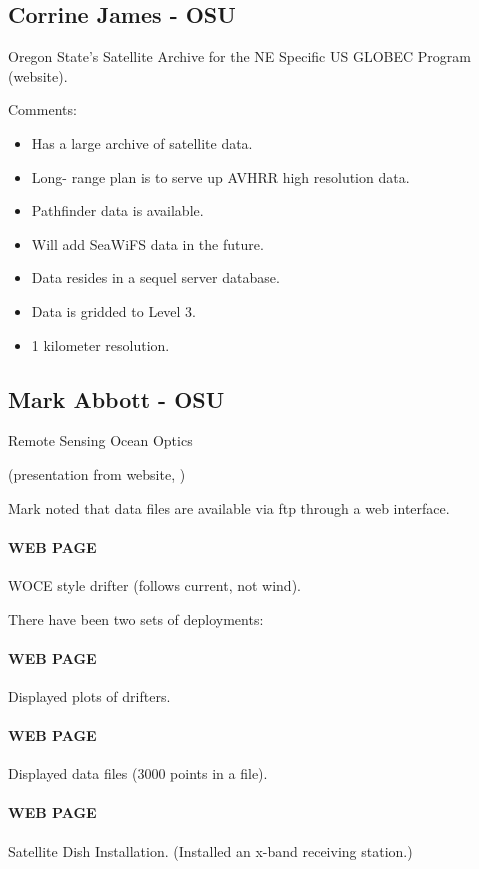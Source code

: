 \subsection{Corrine James - OSU}

Oregon State's Satellite Archive for the NE Specific US GLOBEC Program (website).

Comments:

\begin{itemize}
\item Has a large archive of satellite data.
\item Long- range plan is to serve up AVHRR high resolution data.
\item Pathfinder data is available.
\item Will add SeaWiFS data in the future.
\item Data resides in a sequel server database.
\item Data is gridded to Level 3.
\item 1 kilometer resolution.
\end{itemize}

\subsection{Mark Abbott - OSU}

Remote Sensing Ocean Optics

(presentation from website,
)

Mark noted that data files are available via ftp through a web interface.

\paragraph{WEB PAGE}       WOCE style drifter (follows current, not wind).

There have been two sets of deployments:

\paragraph{WEB PAGE}       Displayed plots of drifters.

\paragraph{WEB PAGE}       Displayed data files (3000 points in a file).

\paragraph{WEB PAGE}       Satellite Dish Installation. (Installed an x-band receiving station.)

